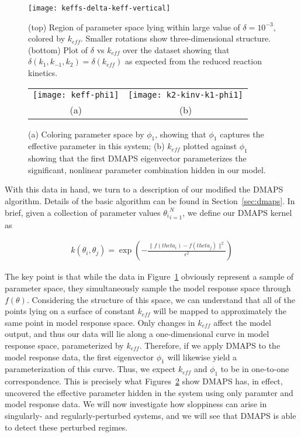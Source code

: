 \begin{figure}[ht!]
  \centering
  \texttt{[image: keffs-delta-keff-vertical]}
  \caption[Quantitative three-dimensional views of level sets of the
  effective parameter in a model of chemical kinetics]{(top) Region of
    parameter space lying within large value of $\delta = 10^{-3}$,
    colored by $k_{eff}$. Smaller rotations show three-dimensional
    structure. (bottom) Plot of $\delta$ vs $k_{eff}$ over the dataset
    showing that $\delta(k_1, k_{-1}, k_2) = \delta(k_{eff})$ as
    expected from the reduced reaction kinetics. \label{fig:abc-keff}}
\end{figure}


\begin{figure}[!htp]
  \centering
  \begin{tabular}{cc}
    \texttt{[image: keff-phi1]} &
                                                        \texttt{[image: k2-kinv-k1-phi1]}\\
    (a) & (b)
  \end{tabular}
  \caption{(a) Coloring parameter space by $\phi_1$, showing that
    $\phi_1$ captures the effective parameter in this system; (b)
    $k_{eff}$ plotted against $\phi_1$ showing that the first DMAPS
    eigenvector parameterizes the significant, nonlinear parameter
    combination hidden in our model. \label{fig:abc-dmaps}}
\end{figure}


With this data in hand, we turn to a description of our modified the
DMAPS algorithm. Details of the basic algorithm can be found in
Section~\ref{sec:dmaps}. In brief, given a collection of parameter
values ${\theta_i}_{i=1}^N$, we define our DMAPS kernel as

\begin{align}
  k(\theta_i, \theta_j) = \exp \left(-\frac{\|f(theta_i) -
  f(theta_j)\|^2}{\epsilon^2} \right)
  \label{eq:dmaps-mm}
\end{align}

The key point is that while the data in Figure~\ref{fig:abc-keff}
obviously represent a sample of parameter space, they simultaneously
sample the model response space through $f(\theta)$. Considering the
structure of this space, we can understand that all of the points
lying on a surface of constant $k_{eff}$ will be mapped to
approximately the same point in model response space. Only changes in
$k_{eff}$ affect the model output, and thus our data will lie along a
one-dimensional curve in model response space, parameterized by
$k_{eff}$. Therefore, if we apply DMAPS to the model response data,
the first eigenvector $\phi_1$ will likewise yield a parameterization
of this curve. Thus, we expect $k_{eff}$ and $\phi_1$ to be in
one-to-one correspondence. This is precisely what
Figures~\ref{fig:abc-dmaps} show DMAPS has, in effect, uncovered the
effective parameter hidden in the system using only paramter and model
response data. We will now investigate how sloppiness can arise in
singularly- and regularly-perturbed systems, and we will see that
DMAPS is able to detect these perturbed regimes.


